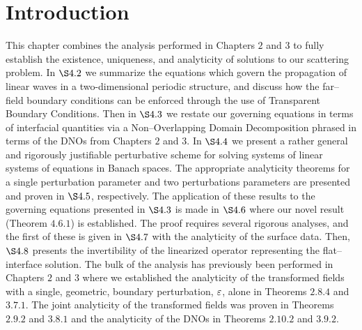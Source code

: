 \section{Introduction}
\label{intro:chapter 4 introduction}
This chapter combines the analysis performed in Chapters $2$ and $3$ to fully establish the existence, uniqueness, and analyticity of solutions to our scattering problem.  In $\S4.2$ we summarize the equations which govern the propagation of linear waves in a two-dimensional periodic structure, and discuss how the far--field boundary conditions can be enforced through the use of Transparent Boundary Conditions. Then in
$\S4.3$ we restate our governing equations in terms of interfacial quantities via a Non--Overlapping Domain Decomposition phrased in terms of the DNOs from Chapters $2$ and $3$. In $\S4.4$ we present a rather general and rigorously justifiable perturbative scheme for solving systems of linear systems of equations in Banach spaces. The appropriate analyticity theorems for a single perturbation parameter and two perturbations parameters are presented and proven in $\S4.5$, respectively. The application of these results to the governing equations presented in $\S4.3$ is made in $\S4.6$ where our novel result (Theorem $4.6.1$) is established. The proof requires several rigorous analyses, and the first of these is given in $\S4.7$ with the analyticity of the surface data. Then, $\S4.8$ presents the invertibility of the linearized operator representing the flat--interface solution. The bulk of the analysis has previously been performed in Chapters $2$ and $3$ where we established the analyticity of the transformed fields with a single, geometric, boundary perturbation, $\varepsilon$, alone in Theorems $2.8.4$ and $3.7.1$. The joint analyticity of the transformed fields was proven in Theorems $2.9.2$ and $3.8.1$ and the analyticity of the DNOs in Theorems $2.10.2$ and $3.9.2$.
